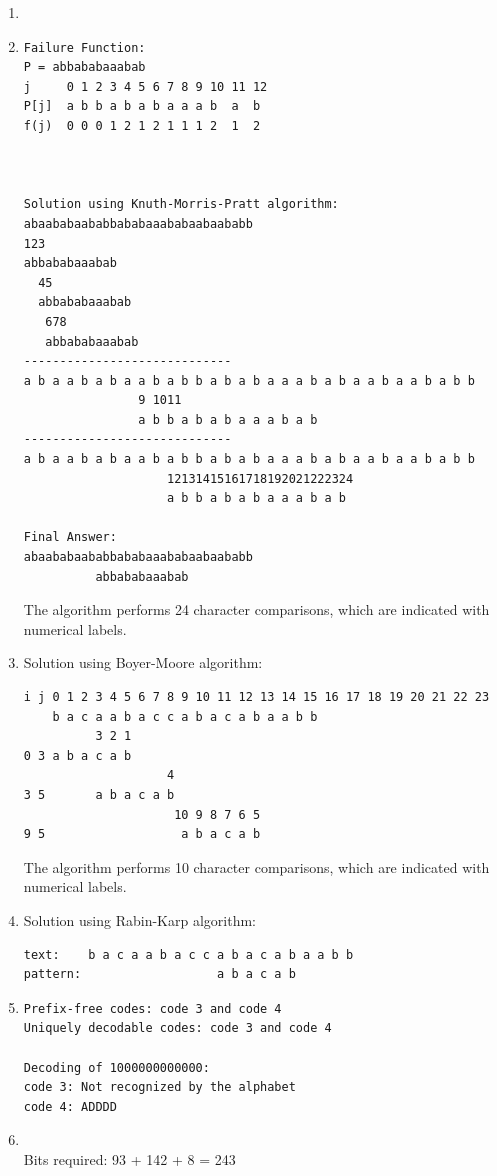 \documentclass[11pt,fleqn]{article}
\begin{document}
\begin{enumerate}
	\item $~$\\

	\item 
\begin{Verbatim}
Failure Function:
P = abbababaaabab
j     0 1 2 3 4 5 6 7 8 9 10 11 12
P[j]  a b b a b a b a a a b  a  b
f(j)  0 0 0 1 2 1 2 1 1 1 2  1  2



Solution using Knuth-Morris-Pratt algorithm:
abaababaababbababaaababaabaababb
123
abbababaaabab
  45
  abbababaaabab
   678
   abbababaaabab
-----------------------------
a b a a b a b a a b a b b a b a b a a a b a b a a b a a b a b b
                9 1011
                a b b a b a b a a a b a b
-----------------------------
a b a a b a b a a b a b b a b a b a a a b a b a a b a a b a b b
                    12131415161718192021222324
                    a b b a b a b a a a b a b

Final Answer:
abaababaababbababaaababaabaababb
          abbababaaabab
\end{Verbatim}
The algorithm performs 24 character comparisons, which are
indicated with numerical labels.

	\item Solution using Boyer-Moore algorithm:
\begin{Verbatim}
i j 0 1 2 3 4 5 6 7 8 9 10 11 12 13 14 15 16 17 18 19 20 21 22 23
    b a c a a b a c c a b a c a b a a b b
          3 2 1
0 3 a b a c a b
                    4
3 5       a b a c a b
                     10 9 8 7 6 5
9 5                   a b a c a b
\end{Verbatim}
The algorithm performs 10 character comparisons, which are
indicated with numerical labels.
	\item Solution using Rabin-Karp algorithm:
\begin{Verbatim}
text:    b a c a a b a c c a b a c a b a a b b
pattern:                   a b a c a b
\end{Verbatim}

	\item 
\begin{Verbatim}
Prefix-free codes: code 3 and code 4
Uniquely decodable codes: code 3 and code 4

Decoding of 1000000000000:
code 3: Not recognized by the alphabet
code 4: ADDDD
\end{Verbatim}

	\item  $~$\\
Bits required: 93 + 142 + 8 = 243


\end{enumerate}
\end{document}
